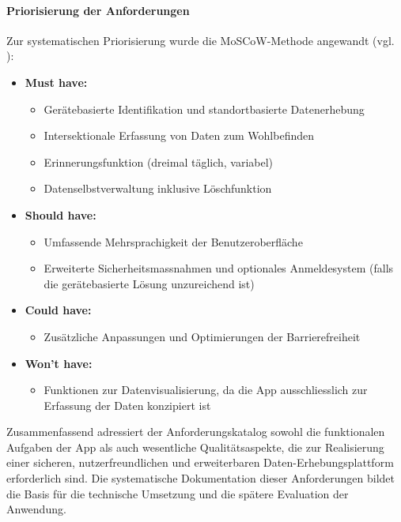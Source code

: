 \paragraph{Priorisierung der Anforderungen}  
Zur systematischen Priorisierung wurde die MoSCoW-Methode angewandt (vgl. \cite{cleggCaseMethodFastTrack1994}):
\begin{itemize}
    \item \textbf{Must have:}  
    \begin{itemize}
        \item Gerätebasierte Identifikation und standortbasierte Datenerhebung
        \item Intersektionale Erfassung von Daten zum Wohlbefinden
        \item Erinnerungsfunktion (dreimal täglich, variabel)
        \item Datenselbstverwaltung inklusive Löschfunktion
    \end{itemize}
    \item \textbf{Should have:}  
    \begin{itemize}
        \item Umfassende Mehrsprachigkeit der Benutzeroberfläche
        \item Erweiterte Sicherheitsmassnahmen und optionales Anmeldesystem (falls die gerätebasierte Lösung unzureichend ist)
    \end{itemize}
    \item \textbf{Could have:}  
    \begin{itemize}
        \item Zusätzliche Anpassungen und Optimierungen der Barrierefreiheit
    \end{itemize}
    \item \textbf{Won’t have:}  
    \begin{itemize}
        \item Funktionen zur Datenvisualisierung, da die App ausschliesslich zur Erfassung der Daten konzipiert ist
    \end{itemize}
\end{itemize}

Zusammenfassend adressiert der Anforderungskatalog sowohl die funktionalen Aufgaben der App als auch wesentliche Qualitätsaspekte, die zur Realisierung einer sicheren, nutzerfreundlichen und erweiterbaren Daten-Erhebungsplattform erforderlich sind. Die systematische Dokumentation dieser Anforderungen bildet die Basis für die technische Umsetzung und die spätere Evaluation der Anwendung.
